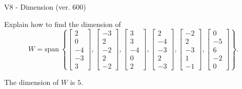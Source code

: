 \begin{exercise}
  \begin{exerciseTitle}V8 - Dimension (ver. 600)\end{exerciseTitle}
  \begin{exerciseStatement}
    Explain how to find the dimension of 
\[W=\mathrm{span}\ \left\{\left[\begin{array}{r}
2 \\
0 \\
-4 \\
-3 \\
3
\end{array}\right] , \left[\begin{array}{r}
-3 \\
2 \\
-2 \\
2 \\
-2
\end{array}\right] , \left[\begin{array}{r}
3 \\
3 \\
-4 \\
0 \\
2
\end{array}\right] , \left[\begin{array}{r}
2 \\
-4 \\
-3 \\
2 \\
-3
\end{array}\right] , \left[\begin{array}{r}
-2 \\
2 \\
-3 \\
1 \\
-1
\end{array}\right] , \left[\begin{array}{r}
0 \\
-5 \\
6 \\
-2 \\
0
\end{array}\right]\right\}.\]



  \end{exerciseStatement}
  \begin{exerciseAnswer}
   The dimension of \(W\) is  \(5\).
  


  \end{exerciseAnswer}
\end{exercise}